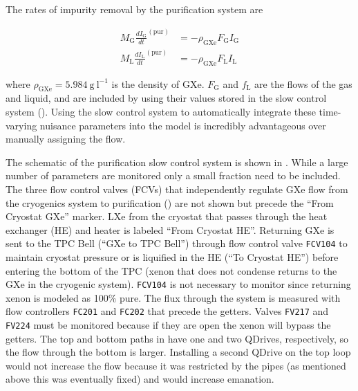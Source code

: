 The rates of impurity removal by the purification system are

\begin{subequations}
\begin{align}
M_{\mathrm{G}} \frac{dI_{\mathrm{G}}}{dt}^{(\mathrm{pur})} &= -\rho_{\mathrm{GXe}} F_{\mathrm{G}} I_{\mathrm{G}}
\label{eq:electron_lifetime_model_removal_gxe}
\\
M_{\mathrm{L}} \frac{dI_{\mathrm{L}}}{dt}^{(\mathrm{pur})} &= -\rho_{\mathrm{GXe}} F_{\mathrm{L}} I_{\mathrm{L}}
\label{eq:electron_lifetime_model_removal_lxe}
\end{align}
\end{subequations}

\noindent where $\rho_{\mathrm{GXe}} = 5.984\ \mathrm{g\ l^{-1}}$ is the density of GXe.  $F_{\mathrm{G}}$ and $f_{\mathrm{L}}$ are the
flows of the gas and liquid, and are included by using their values stored in the slow control system
().  Using the slow control system to automatically integrate these time-varying nuisance
parameters into the model is incredibly advantageous over manually assigning the flow.

The schematic of the purification slow control system is shown in .  While a large
number of parameters are monitored only a small fraction need to be included.  The three flow control valves (FCVs) that independently
regulate GXe flow from the cryogenics system to purification () are not shown but precede the
``From Cryostat GXe'' marker.  LXe from the cryostat that passes
through the heat exchanger (HE) and heater is labeled ``From Cryostat HE''.  Returning GXe is sent to the TPC Bell (``GXe to TPC Bell'')
through flow control valve \texttt{FCV104} to maintain cryostat pressure or is liquified in the HE (``To
Cryostat HE'') before entering the bottom of the TPC (xenon that does not
condense returns to the GXe in the cryogenic system).  \texttt{FCV104} is not necessary to monitor since returning xenon is modeled
as 100\% pure.  The flux through the system is
measured with flow controllers \texttt{FC201} and \texttt{FC202} that precede the getters.  Valves
\texttt{FV217} and \texttt{FV224} must be monitored because if they are open the xenon will bypass the getters.  The top and bottom
paths in  have one
and two QDrives, respectively, so the flow through the bottom is larger.  Installing a second QDrive on the top loop would not
increase the flow because it was restricted by the pipes (as mentioned above this was eventually fixed) and would increase 
emanation.

